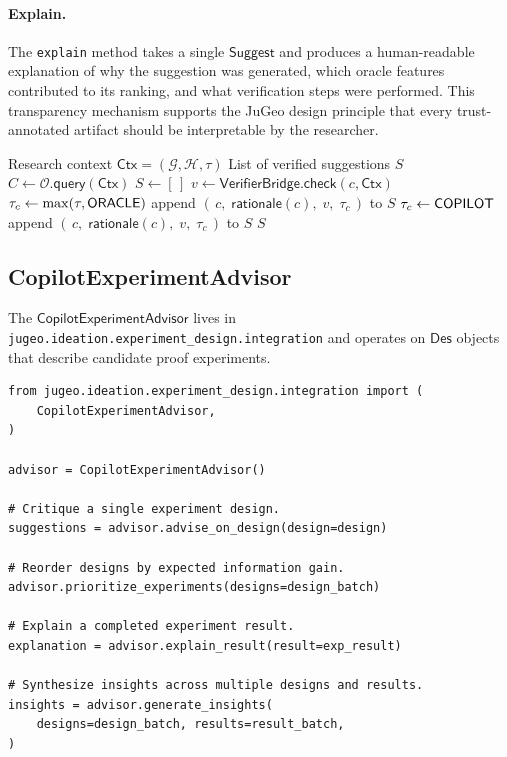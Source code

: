 \documentclass[11pt]{article}
\newcommand{\Oracle}{\mathcal{O}}
\newcommand{\Suggest}{\mathsf{Suggest}}
\newcommand{\Context}{\mathsf{Ctx}}
\newcommand{\Design}{\mathsf{Des}}
\begin{document}
\paragraph{Explain.}
The \texttt{explain} method takes a single $\Suggest$ and
produces a human-readable explanation of why the suggestion was
generated, which oracle features contributed to its ranking, and
what verification steps were performed.  This transparency
mechanism supports the JuGeo design principle that every
trust-annotated artifact should be interpretable by the
researcher.

\begin{algorithm}
\caption{Research Advisor pipeline}\label{alg:research-pipeline}
\begin{algorithmic}[1]
\REQUIRE Research context $\Context = (\mathcal{G}, \mathcal{H}, \tau)$
\ENSURE  List of verified suggestions $S$
\STATE $C \gets \Oracle.\mathsf{query}(\Context)$
\STATE $S \gets [\,]$
  \STATE $v \gets \mathsf{VerifierBridge}.\mathsf{check}(c, \Context)$
    \STATE $\tau_c \gets \max(\tau, \mathsf{ORACLE})$
    \STATE append $(\,c,\; \mathsf{rationale}(c),\; v,\; \tau_c\,)$
           to $S$
  \ELSE
    \STATE $\tau_c \gets \mathsf{COPILOT}$
    \STATE append $(\,c,\; \mathsf{rationale}(c),\; v,\; \tau_c\,)$
           to $S$
  \ENDIF
\ENDFOR
\RETURN $S$
\end{algorithmic}
\end{algorithm}

\subsection{CopilotExperimentAdvisor}\label{sec:experiment-advisor}

The $\mathsf{CopilotExperimentAdvisor}$ lives in
\texttt{jugeo.ideation.experiment\_design.integration} and
operates on $\Design$ objects that describe candidate proof
experiments.

\begin{lstlisting}[style=jugeo-python,caption={CopilotExperimentAdvisor core interface.},label={lst:experiment-advisor}]
from jugeo.ideation.experiment_design.integration import (
    CopilotExperimentAdvisor,
)

advisor = CopilotExperimentAdvisor()

# Critique a single experiment design.
suggestions = advisor.advise_on_design(design=design)

# Reorder designs by expected information gain.
advisor.prioritize_experiments(designs=design_batch)

# Explain a completed experiment result.
explanation = advisor.explain_result(result=exp_result)

# Synthesize insights across multiple designs and results.
insights = advisor.generate_insights(
    designs=design_batch, results=result_batch,
)
\end{lstlisting}
\end{document}
